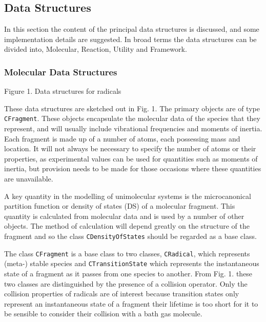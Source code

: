 \subsection{Data Structures
}\label{sec:DataStructures}

In this section the content of the principal data structures is discussed, and some implementation details are suggested. In broad terms the data structures can be divided into, Molecular, Reaction, Utility and Framework.

\subsubsection{Molecular Data Structures
}\label{sec:MolecularDataStructures
}

 

Figure 1. Data structures for radicals

These data structures are sketched out in Fig. 1. The primary objects are of type \verb|CFragment|. These objects encapsulate the molecular data of the species that they represent, and will usually include vibrational frequencies and moments of inertia. Each fragment is made up of a number of atoms, each possessing mass and location. It will not always be necessary to specify the number of atoms or their properties, as experimental values can be used for quantities such as moments of inertia, but provision needs to be made for those occasions where these quantities are unavailable.

A key quantity in the modelling of unimolecular systems is the microcanonical partition function or density of states (DS) of a molecular fragment. This quantity is calculated from molecular data and is used by a number of other objects. The method of calculation will depend greatly on the structure of the fragment and so the class \verb|CDensityOfStates| should be regarded as a base class.

The class \verb|CFragment| is a base class to two classes, \verb|CRadical|, which represents (meta-) stable species and \verb|CTransitionState| which represents the instantaneous state of a fragment as it passes from one species to another. From Fig. 1. these two classes are distinguished by the presence of a collision operator. Only the collision properties of radicals are of interest because transition states only represent an instantaneous state of a fragment their lifetime is too short for it to be sensible to consider their collision with a bath gas molecule.

